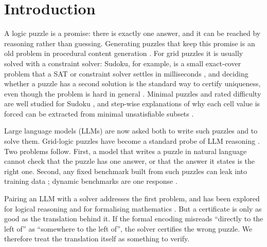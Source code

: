 \section{Introduction}

A logic puzzle is a promise: there is exactly one answer, and it can be reached by reasoning rather than guessing. Generating puzzles that keep this promise is an old problem in procedural content generation \citep{shaker2016pcg,smith2011asp,browne2010evolutionary}. For grid puzzles it is usually solved with a constraint solver: Sudoku, for example, is a small exact-cover problem that a SAT or constraint solver settles in milliseconds \citep{simonis2005sudoku,lynce2006sudoku,weber2005sudoku}, and deciding whether a puzzle has a second solution is the standard way to certify uniqueness, even though the problem is hard in general \citep{yato2003complexity}. Minimal puzzles and rated difficulty are well studied for Sudoku \citep{mcguire2014sudoku,pelanek2014difficulty}, and step-wise explanations of why each cell value is forced can be extracted from minimal unsatisfiable subsets \citep{bogaerts2021stepwise}.

Large language models (LLMs) are now asked both to write such puzzles and to solve them. Grid-logic puzzles have become a standard probe of LLM reasoning \citep{lin2025zebralogic,tyagi2024grid}. Two problems follow. First, a model that writes a puzzle in natural language cannot check that the puzzle has one answer, or that the answer it states is the right one. Second, any fixed benchmark built from such puzzles can leak into training data \citep{sainz2023contamination,golchin2024timetravel}; dynamic benchmarks are one response \citep{kiela2021dynabench}.

Pairing an LLM with a solver addresses the first problem, and has been explored for logical reasoning \citep{pan2023logiclm,ye2023satlm,olausson2023linc} and for formalising mathematics \citep{wu2022autoformalization}. But a certificate is only as good as the translation behind it. If the formal encoding misreads ``directly to the left of'' as ``somewhere to the left of'', the solver certifies the wrong puzzle. We therefore treat the translation itself as something to verify.


